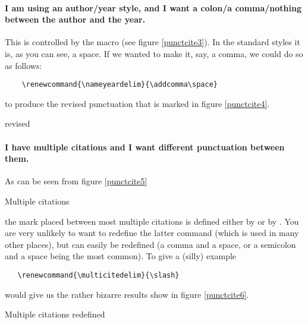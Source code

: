 \paragraph{I am using an author/year style, and I want a colon/a
  comma/nothing between the author and the year.}
\begin{marginfigure}[4ex]
\vspace{3pt}%
\caption{}\label{punctcite3}
\end{marginfigure}
This is controlled by the  macro (see figure
\ref{punctcite3}). In the standard styles it is, as you can see, a
space. If we wanted to make it, say, a comma, we could do so as
follows:
\begin{Verbatim}
    \renewcommand{\nameyeardelim}{\addcomma\space}
\end{Verbatim}
to produce the revised punctuation that is marked in figure
\ref{punctcite4}.
\begin{marginfigure}[4ex]
\vspace{3pt}%
\caption{ revised}\label{punctcite4}
\end{marginfigure}

\paragraph{I have multiple citations and I want different punctuation
  between them.} As can be seen from figure \ref{punctcite5}
\begin{marginfigure}[4ex]
\vspace{3pt}%
\caption{Multiple citations}\label{punctcite5}
\end{marginfigure}
the mark placed between most multiple citations is defined either by
 or by . You are very unlikely to
want to redefine the latter command (which is used in many other
places), but  can easily be redefined (a comma and
a space, or a semicolon and a space being the most common). To give a
(silly) example
\begin{Verbatim}
   \renewcommand{\multicitedelim}{\slash}
\end{Verbatim}
would give us the rather bizarre results show in figure
\ref{punctcite6}.
\begin{marginfigure}[-8ex]
\vspace{3pt}%
\caption{Multiple citations redefined}\label{punctcite6}
\end{marginfigure}

